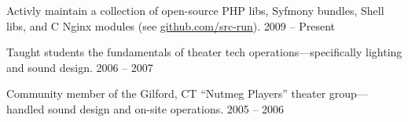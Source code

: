 %
%
%
%



\begin{cvservices}

  \cvservice
    {Activly maintain} %
    {a collection of open-source PHP libs, Syfmony bundles, Shell libs, and C Nginx modules (see \href{https://github.com/src-run}{github.com/src-run}).} %
    {2009 -- Present} %

  \cvservice
    {Taught students} %
    {the fundamentals of theater tech operations---specifically lighting and sound design.} %
    {2006 -- 2007} %

  \cvservice
    {Community member} %
    {of the Gilford, CT ``Nutmeg Players'' theater group---handled sound design and on-site operations.} %
    {2005 -- 2006} %

\end{cvservices}
